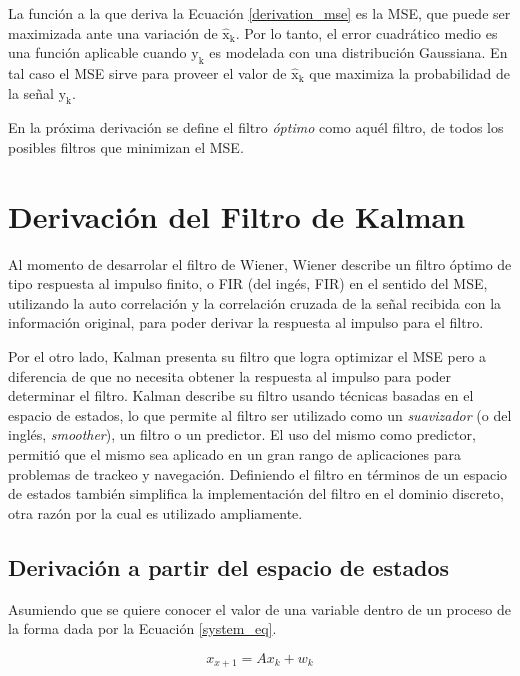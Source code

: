 \documentclass[10pt, a4paper]{report}
\begin{document}
La funci\'on a la que deriva la Ecuaci\'on \ref{derivation_mse} es la
\acrshort{MSE}, que puede ser maximizada ante una variaci\'on de
$\mathrm{\hat{x}_k}$. Por lo tanto, el error cuadr\'atico medio es una funci\'on
aplicable cuando $\mathrm{y_k}$ es modelada con una distribuci\'on Gaussiana.
En tal caso el \acrshort{MSE} sirve para proveer el valor de
$\mathrm{\hat{x}_k}$ que maximiza la probabilidad de la señal $\mathrm{y_k}$.

En la pr\'oxima derivaci\'on se define el filtro \emph{\'optimo} como aqu\'el
filtro, de todos los posibles filtros que minimizan el \acrshort{MSE}.

\section{Derivaci\'on del Filtro de Kalman}

\noindent Al momento de desarrolar el filtro de Wiener, Wiener describe un 
filtro \'optimo de tipo respuesta al impulso finito, o \acrshort{FIR} (del 
ing\'es, \acrlong{FIR}) en el sentido del \acrshort{MSE}, utilizando la auto
correlaci\'on y la correlaci\'on cruzada de la señal recibida con la
informaci\'on original, para poder derivar la respuesta al impulso para el
filtro. 

\noindent Por el otro lado, Kalman presenta su filtro que logra optimizar el
\acrshort{MSE} pero a diferencia de que no necesita obtener la respuesta al
impulso para poder determinar el filtro. Kalman describe su filtro usando
t\'ecnicas basadas en el espacio de estados, lo que permite al filtro ser
utilizado como un \emph{suavizador} (o del ingl\'es, \emph{smoother}), un filtro
o un predictor. El uso del mismo como predictor, permiti\'o que el mismo sea
aplicado en un gran rango de aplicaciones para problemas de trackeo y
navegaci\'on. Definiendo el filtro en t\'erminos de un espacio de estados
tambi\'en simplifica la implementaci\'on del filtro en el dominio discreto, otra
raz\'on por la cual es utilizado ampliamente.

\subsection{Derivaci\'on a partir del espacio de estados}

\noindent Asumiendo que se quiere conocer el valor de una variable dentro de un 
proceso de la forma dada por la Ecuaci\'on \ref{system_eq}.

\begin{equation}
    x_{x+1} = Ax_k + w_k \label{system_eq}
\end{equation}
\end{document}

